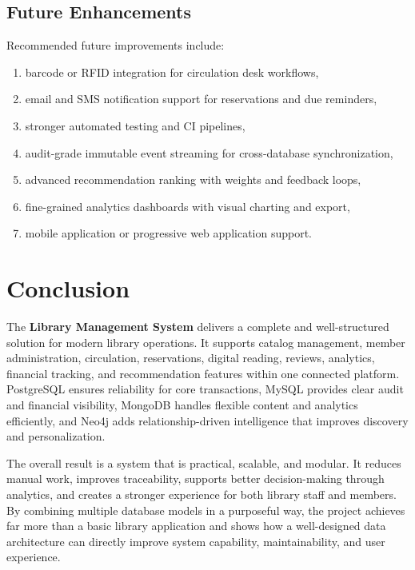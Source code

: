 \documentclass[12pt,a4paper]{report}
\begin{document}
\section{Future Enhancements}
Recommended future improvements include:
\begin{enumerate}[leftmargin=1.5em]
    \item barcode or RFID integration for circulation desk workflows,
    \item email and SMS notification support for reservations and due reminders,
    \item stronger automated testing and CI pipelines,
    \item audit-grade immutable event streaming for cross-database synchronization,
    \item advanced recommendation ranking with weights and feedback loops,
    \item fine-grained analytics dashboards with visual charting and export,
    \item mobile application or progressive web application support.
\end{enumerate}

\chapter{Conclusion}
The \textbf{Library Management System} delivers a complete and well-structured solution for modern library operations. It supports catalog management, member administration, circulation, reservations, digital reading, reviews, analytics, financial tracking, and recommendation features within one connected platform. PostgreSQL ensures reliability for core transactions, MySQL provides clear audit and financial visibility, MongoDB handles flexible content and analytics efficiently, and Neo4j adds relationship-driven intelligence that improves discovery and personalization.

The overall result is a system that is practical, scalable, and modular. It reduces manual work, improves traceability, supports better decision-making through analytics, and creates a stronger experience for both library staff and members. By combining multiple database models in a purposeful way, the project achieves far more than a basic library application and shows how a well-designed data architecture can directly improve system capability, maintainability, and user experience.
\end{document}
